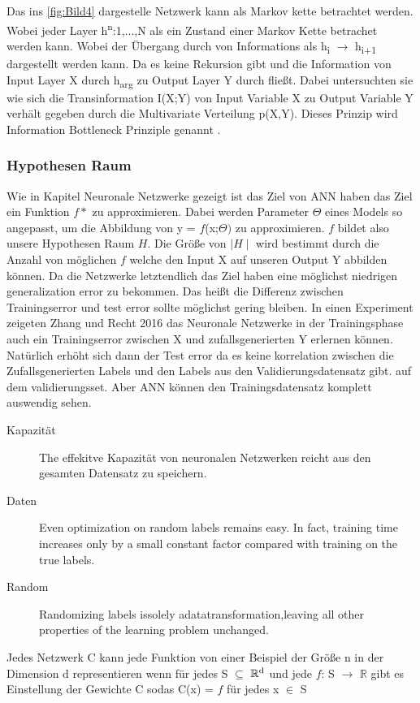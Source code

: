 \documentclass{llncs}
\begin{document}
Das ins \ref{fig:Bild4} dargestelle Netzwerk kann als Markov kette betrachtet werden. Wobei jeder Layer h\textsuperscript{n}:1,...,N als ein Zustand einer Markov Kette betrachet werden kann. Wobei der Übergang durch von Informations als h\textsubscript{i} $\rightarrow$ h\textsubscript{i+1} dargestellt werden kann. Da es keine Rekursion gibt und die Information von Input Layer X durch h\textsubscript{arg} zu Output Layer Y durch fließt. Dabei untersuchten sie wie sich die Transinformation I(X;Y) von Input Variable X zu Output Variable Y verhält gegeben durch die Multivariate Verteilung p(X,Y). Dieses Prinzip wird Information Bottleneck Prinziple genannt \cite{bottleneck}. 

\subsubsection{Hypothesen Raum}

Wie in Kapitel Neuronale Netzwerke gezeigt ist das Ziel von ANN haben das Ziel ein Funktion $f*$ zu approximieren. Dabei werden Parameter $\Theta$ eines Models so angepasst, um die Abbildung von y = $f$(x;$\Theta)$ zu approximieren. $f$ bildet also unsere Hypothesen Raum $H$. Die Größe von $\mid H\mid$ wird bestimmt durch die Anzahl von möglichen $f$ welche den Input X auf unseren Output Y abbilden können. Da die Netzwerke letztendlich das Ziel haben eine möglichst niedrigen generalization error zu bekommen. Das heißt die Differenz zwischen Trainingserror und test error sollte möglichst gering bleiben. In einen Experiment zeigeten Zhang und Recht 2016 \cite{hypothesenraum} das Neuronale Netzwerke in der Trainingsphase auch ein Trainingserror zwischen X und zufallsgenerierten Y erlernen können. Natürlich erhöht sich dann der Test error da es keine korrelation zwischen die Zufallsgenerierten Labels und den Labels aus den Validierungsdatensatz gibt.  auf dem validierungsset. Aber ANN können den Trainingsdatensatz komplett auswendig sehen. 
\begin{description}
	\item[Kapazität] The effekitve Kapazität von neuronalen Netzwerken reicht aus den gesamten Datensatz zu speichern.
	\item[Daten]  Even optimization on random labels remains easy. In fact, training time increases only by a small constant factor compared with training on the true labels.
	\item[Random] Randomizing labels issolely adatatransformation,leaving all other properties of the learning problem unchanged\cite{hypothesenraum}.
	
	
\end{description}
Jedes Netzwerk C kann jede Funktion von einer Beispiel der Größe n in der Dimension d representieren wenn für jedes S $\subseteq$ $\mathbb{R}\textsuperscript{d}$ und jede $f$: S $\rightarrow$ $\mathbb{R}$ gibt es Einstellung der Gewichte C sodas C(x) = $f$ für jedes x $\in$ S \cite{hypothesenraum}
\end{document}
